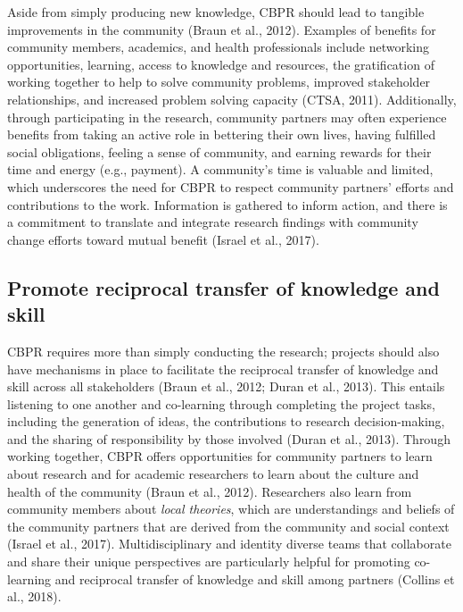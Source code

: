 \documentclass[
  11pt,
]{book}
\begin{document}
Aside from simply producing new knowledge, CBPR should lead to tangible improvements in the community (Braun et al., 2012). Examples of benefits for community members, academics, and health professionals include networking opportunities, learning, access to knowledge and resources, the gratification of working together to help to solve community problems, improved stakeholder relationships, and increased problem solving capacity (CTSA, 2011). Additionally, through participating in the research, community partners may often experience benefits from taking an active role in bettering their own lives, having fulfilled social obligations, feeling a sense of community, and earning rewards for their time and energy (e.g., payment). A community's time is valuable and limited, which underscores the need for CBPR to respect community partners' efforts and contributions to the work. Information is gathered to inform action, and there is a commitment to translate and integrate research findings with community change efforts toward mutual benefit (Israel et al., 2017).

\subsection{Promote reciprocal transfer of knowledge and skill}\label{promote-reciprocal-transfer-of-knowledge-and-skill}

CBPR requires more than simply conducting the research; projects should also have mechanisms in place to facilitate the reciprocal transfer of knowledge and skill across all stakeholders (Braun et al., 2012; Duran et al., 2013). This entails listening to one another and co-learning through completing the project tasks, including the generation of ideas, the contributions to research decision-making, and the sharing of responsibility by those involved (Duran et al., 2013). Through working together, CBPR offers opportunities for community partners to learn about research and for academic researchers to learn about the culture and health of the community (Braun et al., 2012). Researchers also learn from community members about \emph{local theories}, which are understandings and beliefs of the community partners that are derived from the community and social context (Israel et al., 2017). Multidisciplinary and identity diverse teams that collaborate and share their unique perspectives are particularly helpful for promoting co-learning and reciprocal transfer of knowledge and skill among partners (Collins et al., 2018).
\end{document}
